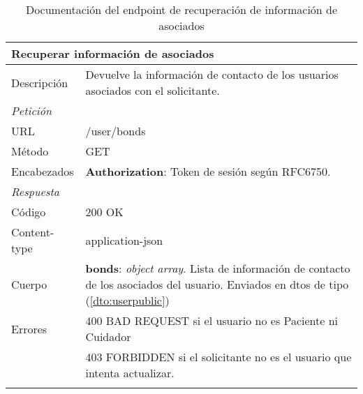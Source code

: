 \begin{longtable}{|p{} p{}|}
    \hline
    \multicolumn{2}{|l|}{\textbf{Recuperar información de asociados}} \\ \hline 
    Descripción         & Devuelve la información de contacto de los usuarios asociados con el solicitante. \\ \hline \hline
    \multicolumn{2}{|l|}{\emph{Petición}}  \\ \hline 
    URL      & /user/bonds \\ \hline
    Método   & GET                  \\ \hline
    Encabezados  & 
    \textbf{Authorization}: Token de sesión según RFC6750. \\ \hline \hline
    \multicolumn{2}{|l|}{\emph{Respuesta}} \\ \hline 
    Código          & 200 OK         \\ \hline
    Content-type    & application-json  \\ \hline
    Cuerpo  & 
    \textbf{bonds}: \emph{object array}. Lista de información de contacto de los asociados del usuario. Enviados en \acrshort{dto}s de tipo \nameref{dto:userpublic} (\ref{dto:userpublic}) \\ \hline \hline
    Errores & 400 BAD REQUEST si el usuario no es Paciente ni Cuidador \\
            & 403 FORBIDDEN si el solicitante no es el usuario que intenta actualizar.
    \\ \hline
    \caption{Documentación del endpoint de recuperación de información de asociados}
    \label{api:recuperar_asociados}
\end{longtable}
